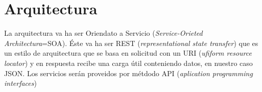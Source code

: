 \chapter*{Arquitectura}
La arquitectura va ha ser Oriendato a Servicio (\textit{Service-Orieted Architectura}=SOA). Éste va ha ser REST (\textit{representational state transfer}) que es un estilo de arquitectura que se basa en solicitud con un URI (\textit{ufiform resource locator}) y en respuesta recibe una carga útil conteniendo datos, en nuestro caso JSON. Los servicios serán proveidos por métdodo API (\textit{aplication programming interfaces})